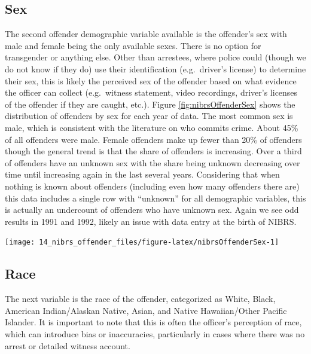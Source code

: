 \documentclass[
]{krantz}
\let\origfigure\figure
\let\endorigfigure\endfigure
\renewenvironment{figure}[1][2] {
    \expandafter\origfigure\expandafter[H]
} {
    \endorigfigure
}
\begin{document}
\subsection{Sex}\label{sex-1}

The second offender demographic variable available is the
offender's sex with male and female being the only available
sexes. There is no option for transgender or anything else.
Other than arrestees, where police could (though we do not
know if they do) use their identification (e.g.~driver's
license) to determine their sex, this is likely the
perceived sex of the offender based on what evidence the
officer can collect (e.g.~witness statement, video
recordings, driver's licenses of the offender if they are
caught, etc.). Figure \ref{fig:nibrsOffenderSex} shows the
distribution of offenders by sex for each year of data. The
most common sex is male, which is consistent with the
literature on who commits crime. About 45\% of all offenders
were male. Female offenders make up fewer than 20\% of
offenders though the general trend is that the share of
offenders is increasing. Over a third of offenders have an
unknown sex with the share being unknown decreasing over
time until increasing again in the last several years.
Considering that when nothing is known about offenders
(including even how many offenders there are) this data
includes a single row with ``unknown'' for all demographic
variables, this is actually an undercount of offenders who
have unknown sex. Again we see odd results in 1991 and 1992,
likely an issue with data entry at the birth of NIBRS.

\begin{figure}

{\centering \texttt{[image: 14\_nibrs\_offender\_files/figure-latex/nibrsOffenderSex-1]} 

}

\caption{The share of offenders by sex, 1991-2022.}\label{fig:nibrsOffenderSex}
\end{figure}

\subsection{Race}\label{race-2}

The next variable is the race of the offender, categorized
as White, Black, American Indian/Alaskan Native, Asian, and
Native Hawaiian/Other Pacific Islander. It is important to
note that this is often the officer's perception of race,
which can introduce bias or inaccuracies, particularly in
cases where there was no arrest or detailed witness account.
\end{document}
